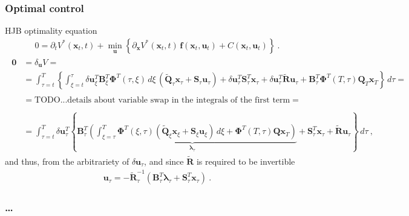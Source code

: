 \documentclass[letterpaper,10pt,english]{jupyterBook}
\begin{document}
\sphinxAtStartPar
{}
\subsubsection*{Optimal control}

\sphinxAtStartPar
HJB optimality equation
\begin{equation*}
\begin{split}0 = \partial_t V^*(\mathbf{x}_t, t) + \min_{\mathbf{u}} \left\{ \partial_{\mathbf{x}} V^*(\mathbf{x}_t, t) \, \mathbf{f}(\mathbf{x}_t, \mathbf{u}_t) + C(\mathbf{x}_t, \mathbf{u}_t) \right\} \ .\end{split}
\end{equation*}\begin{equation*}
\begin{split}\begin{aligned}
  \mathbf{0}
  & = \delta_{\mathbf{u}} V = \\
  & = \int_{\tau=t}^{T} \left\{ \int_{\xi=t}^\tau \delta \mathbf{u}_\xi^T  \mathbf{B}_\xi^T \boldsymbol\Phi^T(\tau,\xi)  \, d \xi \, \left( \widetilde{\mathbf{Q}}_\tau \mathbf{x}_\tau + \mathbf{S}_\tau \mathbf{u}_\tau \right) + \delta \mathbf{u}_\tau^T \mathbf{S}^T_\tau \mathbf{x}_\tau + \delta \mathbf{u}_\tau^T \widetilde{\mathbf{R}} \mathbf{u}_\tau + \mathbf{B}_\tau^T \boldsymbol\Phi^T(T,\tau) \mathbf{Q}_T \mathbf{x}_T \right\} \, d \tau = \\
  & \\
  & = \text{TODO...details about variable swap in the integrals of the first term} = \\
  & \\
  & = \int_{\tau=t}^{T} \delta \mathbf{u}_\tau^T \left\{ \mathbf{B}^T_\tau \underbrace{\left( \int_{\xi=\tau}^T \boldsymbol\Phi^T(\xi,\tau) \left( \widetilde{\mathbf{Q}}_\xi \mathbf{x}_\xi + \mathbf{S}_\xi \mathbf{u}_\xi \right) \, d \xi + \boldsymbol\Phi^T(T,\tau) \mathbf{Q} \mathbf{x}_T \right)}_{\boldsymbol\lambda_\tau} + \mathbf{S}^T_\tau \mathbf{x}_\tau + \widetilde{\mathbf{R}} \mathbf{u}_\tau \right\} \, d \tau \ ,
\end{aligned}\end{split}
\end{equation*}
\sphinxAtStartPar
and thus, from the arbitrariety of \(\delta \mathbf{u}_\tau\), and since \(\widetilde{\mathbf{R}}\) is required  to be invertible
\begin{equation*}
\begin{split}\mathbf{u}_\tau = - \widetilde{\mathbf{R}}^{-1}_\tau \left( \mathbf{B}_\tau^T \boldsymbol\lambda_\tau + \mathbf{S}^T_\tau \mathbf{x}_\tau \right) \ .\end{split}
\end{equation*}\subsubsection*{…}
\end{document}
